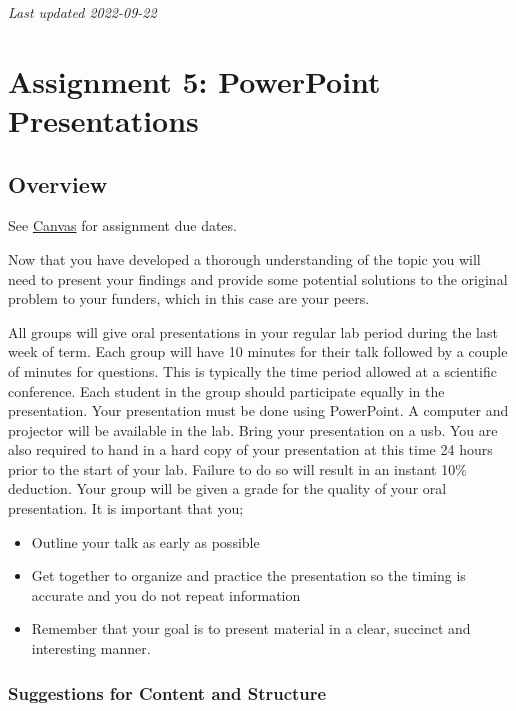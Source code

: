 \documentclass[
]{book}
\providecommand{\tightlist}{%
  \setlength{\itemsep}{0pt}\setlength{\parskip}{0pt}}
\begin{document}
\emph{Last updated 2022-09-22}

\hypertarget{assignment-5-powerpoint-presentations}{%
\chapter*{Assignment 5: PowerPoint Presentations}\label{assignment-5-powerpoint-presentations}}

\hypertarget{overview-3}{%
\section*{Overview}\label{overview-3}}

See \href{https://canvas.ubc.ca}{Canvas} for assignment due dates.

Now that you have developed a thorough understanding of the topic you will need to present your findings and provide some potential solutions to the original problem to your funders, which in this case are your peers.

All groups will give oral presentations in your regular lab period during the last week of term. Each group will have 10 minutes for their talk followed by a couple of minutes for questions. This is typically the time period allowed at a scientific conference. Each student in the group should participate equally in the presentation. Your presentation must be done using PowerPoint. A computer and projector will be available in the lab. Bring your presentation on a usb. You are also required to hand in a hard copy of your presentation at this time 24 hours prior to the start of your lab. Failure to do so will result in an instant 10\% deduction. Your group will be given a grade for the quality of your oral presentation. It is important that you;

\begin{itemize}
\tightlist
\item
  Outline your talk as early as possible
\item
  Get together to organize and practice the presentation so the timing is accurate and you do not repeat information
\item
  Remember that your goal is to present material in a clear, succinct and interesting manner.
\end{itemize}

\hypertarget{suggestions-for-content-and-structure}{%
\subsection*{Suggestions for Content and Structure}\label{suggestions-for-content-and-structure}}
\end{document}
